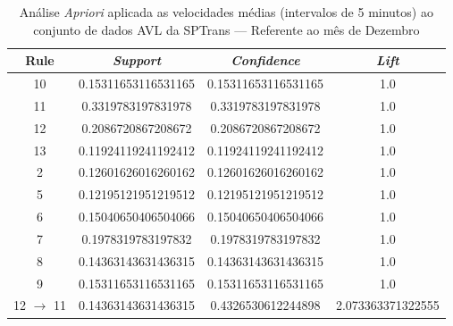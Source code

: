 \documentclass[
	12pt,				%
	oneside,			%
	a4paper,			%
	english,			%
	brazil				%
	]{abntex2ppgsi}
\begin{document}
\begin{apendicesenv}
\begin{table}[!htb]
\centering
\caption {Análise \textit{Apriori} aplicada as velocidades médias (intervalos de 5 minutos) ao conjunto de dados AVL da SPTrans --- Referente ao mês de Dezembro}
\label {tab:aprioriDecember}
\begin{tabular}{c|c|c|c}
\hline
\textbf{Rule} & \textit{\textbf{Support}} & \textit{\textbf{Confidence}} & \textit{\textbf{Lift}} \\
\hline
10 &  0.15311653116531165 &  0.15311653116531165 &  1.0\\
\hline
11 &  0.3319783197831978 &  0.3319783197831978 &  1.0\\
\hline
12 &  0.2086720867208672 &  0.2086720867208672 &  1.0\\
\hline
13 &  0.11924119241192412 &  0.11924119241192412 &  1.0\\
\hline
2 &  0.12601626016260162 &  0.12601626016260162 &  1.0\\
\hline
5 &  0.12195121951219512 &  0.12195121951219512 &  1.0\\
\hline
6 &  0.15040650406504066 &  0.15040650406504066 &  1.0\\
\hline
7 &  0.1978319783197832 &  0.1978319783197832 &  1.0\\
\hline
8 &  0.14363143631436315 &  0.14363143631436315 &  1.0\\
\hline
9 &  0.15311653116531165 &  0.15311653116531165 &  1.0\\
\hline
12 $\rightarrow$ 11 &  0.14363143631436315 &  0.4326530612244898 &  2.073363371322555\\
\hline
\end{tabular}
\end{table}

\end{apendicesenv}
\end{document}

